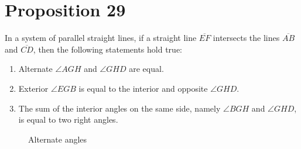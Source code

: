 
\section*{Proposition 29}

\begin{thm}
In a system of parallel straight lines, if a straight line $\overline{EF}$ intersects the lines $\overline{AB}$ and $\overline{CD}$, then the following statements hold true:
\end{thm}

\begin{enumerate}
    \item Alternate $\angle{AGH}$ and $\angle{GHD}$ are equal.
    \item Exterior $\angle{EGB}$ is equal to the interior and opposite $\angle{GHD}$.
    \item The sum of the interior angles on the same side, namely $\angle{BGH}$ and $\angle{GHD}$, is equal to two right angles.
\end{enumerate}


\begin{figure}[H]
   	\caption{Alternate angles}
\end{figure}   	

